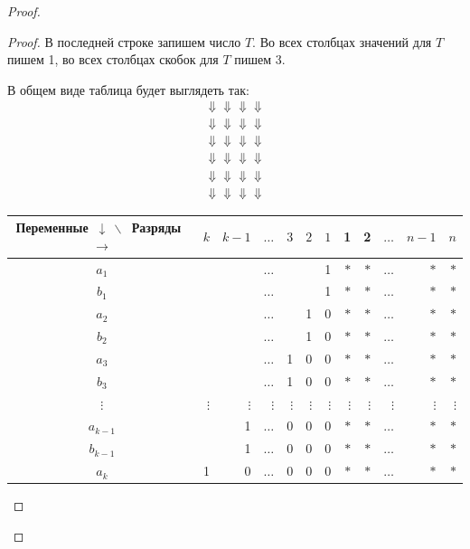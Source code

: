 \documentclass[a4paper,12pt]{article}
\begin{document}
\begin{proof}
\begin{proof}
        В последней строке запишем число $T$. Во всех столбцах значений для $T$ пишем 1, во всех столбцах скобок для $T$ пишем 3.
        
        В общем виде таблица будет выглядеть так:
        \begin{gather*}
            \Downarrow\Downarrow\Downarrow\Downarrow\\
            \Downarrow\Downarrow\Downarrow\Downarrow\\
            \Downarrow\Downarrow\Downarrow\Downarrow\\
            \Downarrow\Downarrow\Downarrow\Downarrow\\
            \Downarrow\Downarrow\Downarrow\Downarrow\\
            \Downarrow\Downarrow\Downarrow\Downarrow
        \end{gather*}
        \begin{center}
        \begin{tabular}{||c||*{6}{r|}|*{5}{r|}|}
        \hline
        \hline
        Переменные\ $\downarrow\ \backslash$\ Разряды\ $\rightarrow$& $k$ & $k - 1$ & $\ldots$ & $3$ & $2$ & $1$ & 1 & 2 & $\ldots$ & $n - 1$ & $n$ \\
        \hline
        \hline
        $a_1$ & & &$\ldots$ & & &1 &$\ast$&$\ast$ &$\ldots$ & $\ast$ & $\ast$\\
        \hline
        $b_1$ & & &$\ldots$ & & &1 &$\ast$ &$\ast$ &$\ldots$ & $\ast$ & $\ast$ \\
        \hline
        $a_2$ & & &$\ldots$ & & 1&0 &$\ast$ &$\ast$ &$\ldots$ & $\ast$ & $\ast$\\
        \hline
        $b_2$ & & &$\ldots$ & & 1&0 &$\ast$ &$\ast$ &$\ldots$ & $\ast$& $\ast$ \\
        \hline
        $a_3$ & & &$\ldots$ &1 & 0&0 &$\ast$ &$\ast$ &$\ldots$ & $\ast$ & $\ast$\\
        \hline
        $b_3$ & & &$\ldots$ &1 &0 &0 &$\ast$ &$\ast$ &$\ldots$ & $\ast$ & $\ast$\\
        \hline 
        $\vdots$ & $\vdots$ &$\vdots$ &$\vdots$ &$\vdots$ &$\vdots$ &$\vdots$ &$\vdots$ &$\vdots$ &$\vdots$ &$\vdots$ &$\vdots$ \\
        \hline
        $a_{k - 1}$ & & 1&$\ldots$ & 0& 0&0 &$\ast$ &$\ast$ &$\ldots$ & $\ast$ & $\ast$\\
        \hline
        $b_{k - 1}$ & &1 &$\ldots$ & 0& 0&0 &$\ast$ &$\ast$ &$\ldots$ & $\ast$ & $\ast$\\
        \hline
        $a_k$ &1 & 0&$\ldots$ & 0& 0&0 &$\ast$ &$\ast$ &$\ldots$ & $\ast$ & $\ast$\\

\end{tabular}
\end{center}
\end{proof}
\end{proof}
\end{document}
